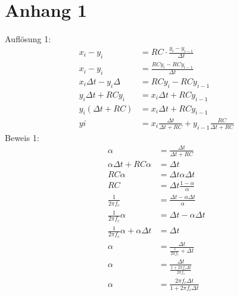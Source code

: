 \documentclass[12pt,a4paper, ngerman]{article}
\begin{document}
\section{Anhang 1}
Auflösung 1:
\begin{align*} 
x_{i}-y_{i}&=RC\cdot \frac{y_{i}-y_{i-1}}{\Delta t} \\ 
x_{i}-y_{i}&=\frac{RCy_{i}-RCy_{i-1}}{\Delta t}\\
x_{i}\Delta t-y_{i}\Delta&=RCy_{i}-RCy_{i-1} \\
y_{i}\Delta t+RCy_{i}&=x_{i}\Delta t+RCy_{i-1} \\
y_{i}(\Delta t+RC)&=x_{i}\Delta t+RCy_{i-1} \\
y{i}&=x_{i}\frac{\Delta t}{\Delta t+RC} + y_{i-1}\frac{RC}{\Delta t+RC}
\end{align*}
Beweis 1:
\begin{align*}
\alpha&=\frac{\Delta t}{\Delta t+RC} \\
\alpha \Delta t+RC\alpha &= \Delta t \\
RC\alpha &= \Delta t \alpha \Delta t \\
RC &= \Delta t \frac{1-\alpha}{\alpha}\\
\frac{1}{2\pi f_{c}} &= \frac{\Delta t -\alpha\Delta t}{\alpha} \\
\frac{1}{2\pi f_{c}} \alpha &= \Delta t -\alpha\Delta t \\
\frac{1}{2\pi f_{c}} \alpha + \alpha\Delta t &= \Delta t \\
\alpha &= \frac{\Delta t}{\frac{1}{2\pi f_{c}} + \Delta t} \\
\alpha &= \frac{\Delta t}{\frac{1+2\pi f_{c}\Delta t}{2\pi f_{c}}} \\
\alpha &= \frac{2\pi f_{c}\Delta t}{1+2\pi f_{c}\Delta t} 
\end{align*}
\end{document}
